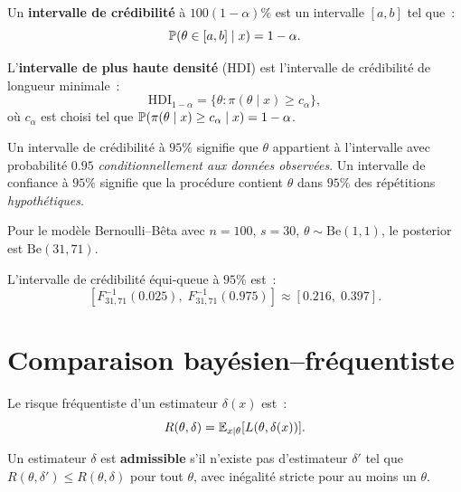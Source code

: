\begin{definition}
Un \textbf{intervalle de cr\'edibilit\'e} \`a $100(1-\alpha)\%$ est un
intervalle $[a, b]$ tel que~:
\[
  \mathbb{P}(\theta \in [a, b] \mid x) = 1 - \alpha.
\]
\end{definition}

\begin{definition}
L'\textbf{intervalle de plus haute densit\'e} (HDI) est l'intervalle
de cr\'edibilit\'e de longueur minimale~:
\[
  \text{HDI}_{1-\alpha} = \{
  \theta : \pi(\theta \mid x) \geq c_\alpha\},
\]
o\`u $c_\alpha$ est choisi tel que
$\mathbb{P}(\pi(\theta \mid x) \geq c_\alpha \mid x) = 1 - \alpha$.
\end{definition}

\begin{attention}[title=\textbf{Cr\'edibilit\'e vs. confiance}]
Un intervalle de cr\'edibilit\'e \`a $95\%$ signifie que $\theta$
appartient \`a l'intervalle avec probabilit\'e $0.95$ \textit{conditionnellement
aux donn\'ees observ\'ees}. Un intervalle de confiance \`a $95\%$
signifie que la proc\'edure contient $\theta$ dans $95\%$ des
r\'ep\'etitions \textit{hypoth\'etiques}.
\end{attention}

\begin{exemple}
Pour le mod\`ele Bernoulli--B\^eta avec $n = 100$, $s = 30$,
$\theta \sim \text{Be}(1,1)$, le posterior est $\text{Be}(31, 71)$.

L'intervalle de cr\'edibilit\'e \'equi-queue \`a $95\%$ est~:
\[
  [F^{-1}_{31,71}(0.025),\; F^{-1}_{31,71}(0.975)]
  \approx [0.216,\; 0.397].
\]
\end{exemple}

\section{Comparaison bay\'esien--fr\'equentiste}

\begin{definition}
Le risque fr\'equentiste d'un estimateur $\delta(x)$ est~:
\[
  R(\theta, \delta) = \mathbb{E}_{x \mid \theta}[L(\theta, \delta(x))].
\]
\end{definition}

\begin{definition}[Admissibilit\'e]
Un estimateur $\delta$ est \textbf{admissible} s'il n'existe pas
d'estimateur $\delta'$ tel que $R(\theta, \delta') \leq R(\theta, \delta)$
pour tout $\theta$, avec in\'egalit\'e stricte pour au moins un $\theta$.
\end{definition}

